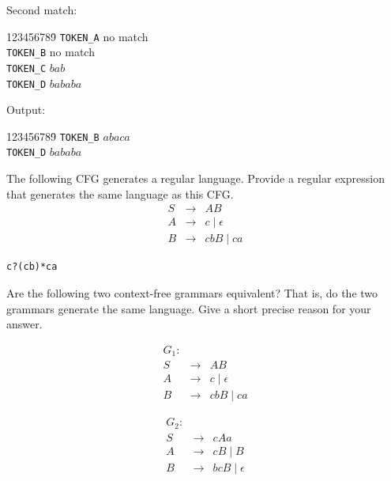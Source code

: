 \documentclass[12pt]{article}
\begin{document}
\begin{exe}
\begin{xlist}
{\begin{soln}
\par\noindent Second match:
\begin{tabbing}
123456789\=\kill
{\tt TOKEN\_A} \> \textrm{no match} \\
{\tt TOKEN\_B} \> \textrm{no match} \\
{\tt TOKEN\_C} \> $bab$ \\
{\tt TOKEN\_D} \> $bababa$ 
\end{tabbing}

\par\noindent Output:
\begin{tabbing}
123456789\=\kill
{\tt TOKEN\_B} \> $abaca$ \\
{\tt TOKEN\_D} \> $bababa$ 
\end{tabbing}
\end{soln}
}

{\ex The following CFG generates a regular language.
Provide a regular expression that generates the same language as this CFG.
\begin{eqnarray}
S & \rightarrow & AB \nonumber \\
A & \rightarrow & c \mid \epsilon \nonumber \\
B & \rightarrow & cbB \mid ca \nonumber
\end{eqnarray}

\begin{soln}
\begin{verbatim}
c?(cb)*ca
\end{verbatim}
\end{soln}
}

{\ex Are the following two context-free grammars equivalent? That is, 
do the two grammars generate the same language. Give a short precise
reason for your answer.
\begin{minipage}[t]{3in}
\begin{eqnarray}
G_1: && \nonumber \\
S & \rightarrow & AB \nonumber \\
A & \rightarrow & c \mid \epsilon \nonumber \\
B & \rightarrow & cbB \mid ca \nonumber
\end{eqnarray}
\end{minipage}
\begin{minipage}[t]{3in}
\begin{eqnarray}
G_2: && \nonumber \\
S & \rightarrow & cAa \nonumber \\
A & \rightarrow & cB \mid B \nonumber \\
B & \rightarrow & bcB \mid \epsilon \nonumber
\end{eqnarray}
\end{minipage}

}
\end{xlist}
\end{exe}
\end{document}

